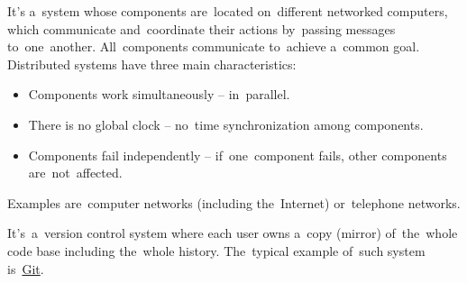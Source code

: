 \label{distributedsystem}
It's a~system whose components are~located on~different networked computers, which communicate and~coordinate their actions by~passing messages to~one~another.
All~components communicate to~achieve a~common goal.
Distributed systems have three main characteristics:
\begin{itemize}
    \item Components work simultaneously -- in~parallel.
    \item There is no global clock -- no~time synchronization among components.
    \item Components fail independently -- if~one~component fails, other components are~not~affected.
\end{itemize}
\noindent Examples are~computer networks (including the~Internet) or~telephone networks.

\label{distributedversioncontrolsystem}
It's~a~version control system where each user owns a~copy (mirror) of~the~whole code base including the~whole history.
The~typical example of~such system is~\hyperref[git]{Git}.
